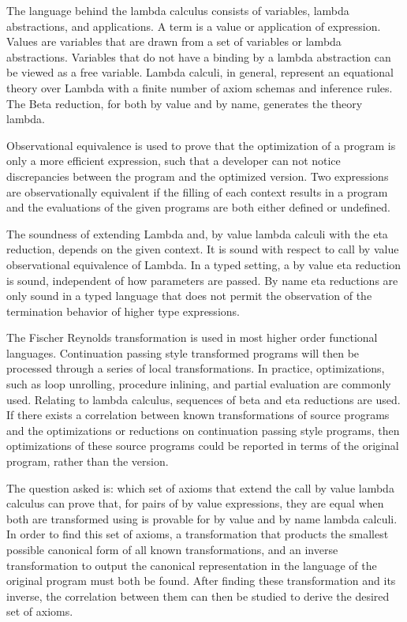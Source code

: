 The language behind the lambda calculus consists of variables, lambda abstractions, and applications. A term is a value or application of expression.  Values are variables that are drawn from a set of variables or lambda abstractions. Variables that do not have a binding by a lambda abstraction can be viewed as a free variable.  Lambda calculi, in general, represent an equational theory over Lambda with a finite number of axiom schemas and inference rules. The Beta reduction, for both by value and by name, generates the theory lambda.

Observational equivalence is used to prove that the optimization of a program is only a more efficient expression, such that a developer can not notice discrepancies between the program and the optimized version. Two expressions are observationally equivalent if the filling of each context results in a program and the evaluations of the given programs are both either defined or undefined.

The soundness of extending Lambda and, by value lambda calculi with the eta reduction, depends on the given context. It is sound with respect to call by value observational equivalence of Lambda. In a typed setting, a by value eta reduction is sound, independent of how parameters are passed. By name eta reductions are only sound in a typed language that does not permit the observation of the termination behavior of higher type expressions.

The Fischer Reynolds \cps transformation is used in most higher order functional languages. Continuation passing style transformed programs will then be processed through a series of local transformations. In practice, optimizations, such as loop unrolling, procedure inlining, and partial evaluation are commonly used. Relating to lambda calculus, sequences of beta and eta reductions are used.  If there exists a correlation between known transformations of source programs and the optimizations or reductions on continuation passing style programs, then optimizations of these source programs could be reported in terms of the original program, rather than the \cps version.

The question asked is: which set of axioms that extend the call by value lambda calculus can prove that, for pairs of by value expressions, they are equal when both are transformed using \cps is provable for by value and by name lambda calculi.  In order to find this set of axioms, a \cps transformation that products the smallest possible canonical form of all known \cps transformations, and an inverse \cps transformation to output the canonical representation in the language of the original program must both be found.  After finding these \cps transformation and its inverse, the correlation between them can then be studied to derive the desired set of axioms.

